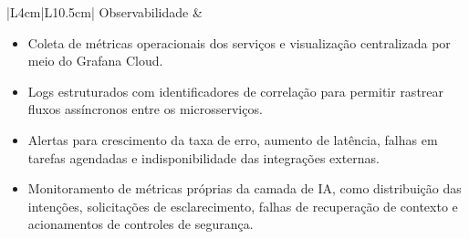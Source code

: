 {\begin{longtable}{|L{4cm}|L{10.5cm}|}
Observabilidade &
\begin{minipage}[t]{\linewidth}
\begin{itemize}[noitemsep,topsep=2pt,leftmargin=*]
    \item Coleta de métricas operacionais dos serviços e visualização centralizada por meio do Grafana Cloud.
    \item Logs estruturados com identificadores de correlação para permitir rastrear fluxos assíncronos entre os microsserviços.
    \item Alertas para crescimento da taxa de erro, aumento de latência, falhas em tarefas agendadas e indisponibilidade das integrações externas.
    \item Monitoramento de métricas próprias da camada de IA, como distribuição das intenções, solicitações de esclarecimento, falhas de recuperação de contexto e acionamentos de controles de segurança.
\end{itemize}
\end{minipage} \\ \hline

\end{longtable}
}
